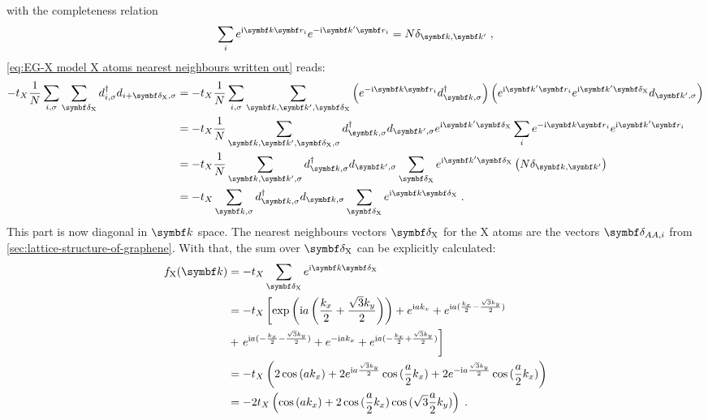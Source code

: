 \documentclass[../main.tex]{subfiles}
\begin{document}
with the completeness relation
\begin{equation}
	\sum_{i} e^{\iu \vb{k} \vb{r}_{i}} e^{-\iu \vb{k}^{\prime} \vb{r}_{i}} = N \delta_{\vb{k}, \vb{k}^{\prime}}
	\;,
\end{equation}
\cref{eq:EG-X model X atoms nearest neighbours written out} reads:
\begin{align}
	-t_X \frac{1}{N} \sum_{i,\sigma} \sum_{\vb{\delta}_{\mathrm{X}}} d_{i, \sigma}^{\dagger} d_{i + \vb{\delta}_{\mathrm{X}}, \sigma}
	&= -t_X \frac{1}{N} \sum_{i,\sigma} \sum_{\vb{k}, \vb{k}^{\prime}, \vb{\delta}_{\mathrm{X}}} \left(e^{-\iu \vb{k} \vb{r}_i} d_{\vb{k}, \sigma}^{\dagger} \right) \left(e^{\iu \vb{k}^{\prime} \vb{r}_i} e^{\iu \vb{k}^{\prime} \vb{\delta}_{\mathrm{X}}} d_{\vb{k}^{\prime}, \sigma} \right) \\
	&= -t_X \frac{1}{N} \sum_{\vb{k}, \vb{k^{\prime}}, \vb{\delta}_{\mathrm{X}}, \sigma} d_{\vb{k}, \sigma}^{\dagger}   d_{\vb{k}^{\prime}, \sigma} e^{\iu \vb{k}^{\prime} \vb{\delta}_{\mathrm{X}}} \sum_{i} e^{-\iu \vb{k} \vb{r}_i} e^{\iu \vb{k}^{\prime} \vb{r}_i} \\
	&= -t_X \frac{1}{N} \sum_{\vb{k}, \vb{k^{\prime}}, \sigma}  d_{\vb{k}, \sigma}^{\dagger}  d_{\vb{k}^{\prime}, \sigma} \sum_{\vb{\delta}_{\mathrm{X}}} e^{\iu \vb{k}^{\prime} \vb{\delta}_{\mathrm{X}}} \left(N \delta_{\vb{k}, \vb{k}^{\prime}} \right)\\
	&= -t_X \sum_{\vb{k}, \sigma}  d_{\vb{k}, \sigma}^{\dagger}d_{\vb{k}, \sigma} \sum_{\vb{\delta}_{\mathrm{X}}} e^{\iu \vb{k} \vb{\delta}_{\mathrm{X}}} \;.
\end{align}
This part is now diagonal in \(\vb{k}\) space.
The nearest neighbours vectors \(\vb{\delta}_{\mathrm{X}}\) for the \(\mathrm{X}\) atoms are the vectors \(\vb{\delta}_{AA, i}\) from \cref{sec:lattice-structure-of-graphene}.
With that, the sum over \(\vb{\delta}_{\mathrm{X}}\) can be explicitly calculated:
\begin{align}
	f_{\mathrm{X}} (\vb{k}) &= -t_X \sum_{\vb{\delta}_{\mathrm{X}}} e^{\iu \vb{k} \vb{\delta}_{\mathrm{X}}} \\
	&= -t_X \left[ \exp\left(\iu a \left(\frac{k_x}{2} + \frac{\sqrt{3} k_y}{2}\right)\right)
	+ e^{\iu a k_x}
	+ e^{\iu a (\frac{k_x}{2} - \frac{\sqrt{3} k_y}{2})}
	\right. \\
	&+ \left. e^{\iu a (-\frac{k_x}{2} - \frac{\sqrt{3} k_y}{2})}
	+ e^{-\iu a k_x}
	+ e^{\iu a (-\frac{k_x}{2} + \frac{\sqrt{3} k_y}{2})} \right] \\
	&= -t_X \left( 2 \cos{(a k_x)} + 2 e^{\iu a \frac{\sqrt{3} k_y}{2}} \cos{(\frac{a}{2} k_x)} + 2 e^{-\iu a \frac{\sqrt{3} k_y}{2}} \cos{(\frac{a}{2} k_x)} \right) \\
	&= -2t_X \left( \cos{(a k_x)} + 2 \cos{(\frac{a}{2} k_x)} \cos{(\sqrt{3} \frac{ a}{2} k_y)} \right) \;.
\end{align}
\end{document}
